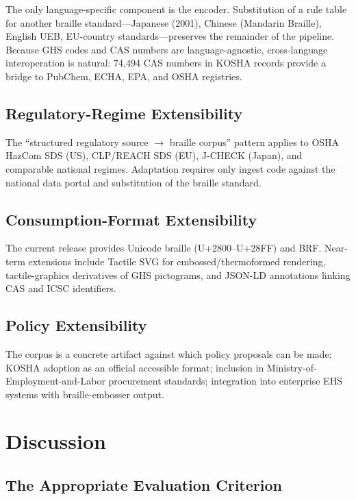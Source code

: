 \documentclass[journal]{IEEEtran}
\begin{document}
The only language-specific component is the encoder. Substitution of a rule table for another braille standard---Japanese (2001), Chinese (Mandarin Braille), English UEB, EU-country standards---preserves the remainder of the pipeline. Because GHS codes and CAS numbers are language-agnostic, cross-language interoperation is natural: 74,494 CAS numbers in KOSHA records provide a bridge to PubChem, ECHA, EPA, and OSHA registries.

\subsection{Regulatory-Regime Extensibility}

The ``structured regulatory source $\rightarrow$ braille corpus'' pattern applies to OSHA HazCom SDS (US), CLP/REACH SDS (EU), J-CHECK (Japan), and comparable national regimes. Adaptation requires only ingest code against the national data portal and substitution of the braille standard.

\subsection{Consumption-Format Extensibility}

The current release provides Unicode braille (U+2800--U+28FF) and BRF. Near-term extensions include Tactile SVG for embossed/thermoformed rendering, tactile-graphics derivatives of GHS pictograms, and JSON-LD annotations linking CAS and ICSC identifiers.

\subsection{Policy Extensibility}

The corpus is a concrete artifact against which policy proposals can be made: KOSHA adoption as an official accessible format; inclusion in Ministry-of-Employment-and-Labor procurement standards; integration into enterprise EHS systems with braille-embosser output.

\section{Discussion}
\label{sec:discussion}

\subsection{The Appropriate Evaluation Criterion}
\end{document}
